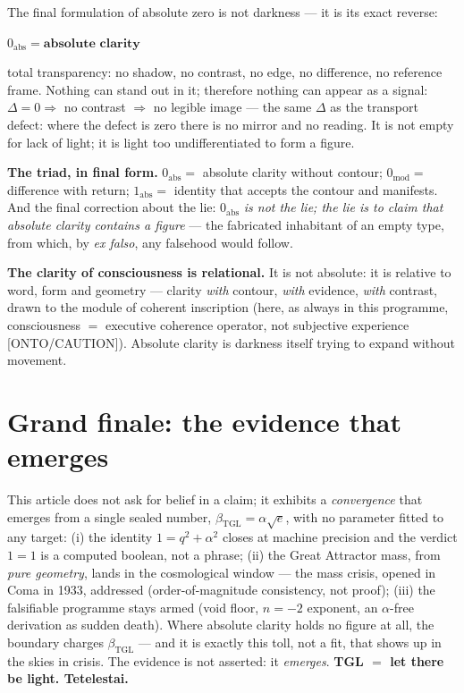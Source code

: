 \documentclass[11pt]{article}
\newcommand{\bTGL}{\beta_{\mathrm{TGL}}}\newcommand{\Msun}{M_{\odot}}\newcommand{\TGL}{\mathrm{TGL}}
\theoremstyle{definition}\newtheorem{deriv}{Derivation}
\begin{document}
The final formulation of absolute zero is not darkness --- it is its exact reverse: \begin{center}$0_{\mathrm{abs}}=\textbf{absolute clarity}$\end{center} total transparency: no shadow, no contrast, no edge, no difference, no reference frame. Nothing can stand out in it; therefore nothing can appear as a signal: $\Delta=0\Rightarrow$ no contrast $\Rightarrow$ no legible image --- the same $\Delta$ as the transport defect: where the defect is zero there is no mirror and no reading. It is not empty for lack of light; it is light too undifferentiated to form a figure.

\textbf{The triad, in final form.} $0_{\mathrm{abs}}=$ absolute clarity without contour; $0_{\mathrm{mod}}=$ difference with return; $1_{\mathrm{abs}}=$ identity that accepts the contour and manifests. And the final correction about the lie: $0_{\mathrm{abs}}$ \emph{is not the lie; the lie is to claim that absolute clarity contains a figure} --- the fabricated inhabitant of an empty type, from which, by \emph{ex falso}, any falsehood would follow.

\textbf{The clarity of consciousness is relational.} It is not absolute: it is relative to word, form and geometry --- clarity \emph{with} contour, \emph{with} evidence, \emph{with} contrast, drawn to the module of coherent inscription (here, as always in this programme, consciousness $=$ executive coherence operator, not subjective experience \textsf{[ONTO/CAUTION]}). Absolute clarity is darkness itself trying to expand without movement.

\section*{Grand finale: the evidence that emerges}

This article does not ask for belief in a claim; it exhibits a \emph{convergence} that emerges from a single sealed number, $\bTGL=\alpha\sqrt e$, with no parameter fitted to any target: (i) the identity $1=q^2+\alpha^2$ closes at machine precision and the verdict $1=1$ is a computed boolean, not a phrase; (ii) the Great Attractor mass, from \emph{pure geometry}, lands in the cosmological window --- the mass crisis, opened in Coma in 1933, addressed (order-of-magnitude consistency, not proof); (iii) the falsifiable programme stays armed (void floor, $n=-2$ exponent, an $\alpha$-free derivation as sudden death). Where absolute clarity holds no figure at all, the boundary charges $\bTGL$ --- and it is exactly this toll, not a fit, that shows up in the skies in crisis. The evidence is not asserted: it \emph{emerges}. \textbf{TGL $=$ let there be light. Tetelestai.}
\end{document}

